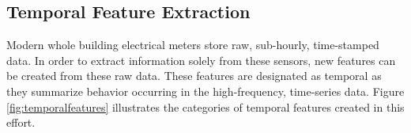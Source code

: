 \subsection{Temporal Feature Extraction}
Modern whole building electrical meters store raw, sub-hourly, time-stamped data. In order to extract information solely from these sensors, new features can be created from these raw data.  These features are designated as temporal as they summarize behavior occurring in the high-frequency, time-series data. Figure \ref{fig:temporalfeatures} illustrates the categories of temporal features created in this effort.
